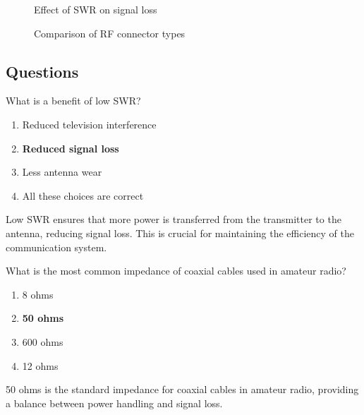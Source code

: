 \begin{figure}[h]
    \centering
    \caption{Effect of SWR on signal loss}
    \label{fig:swr_loss}
\end{figure}

\begin{figure}[h]
    \centering
    \caption{Comparison of RF connector types}
    \label{fig:rf_connectors}
\end{figure}

\subsection*{Questions}
\begin{tcolorbox}[colback=gray!10!white,colframe=black!75!black,title={T9B01}]
    What is a benefit of low SWR?
    \begin{enumerate}[label=\Alph*,noitemsep]
        \item Reduced television interference
        \item \textbf{Reduced signal loss}
        \item Less antenna wear
        \item All these choices are correct
    \end{enumerate}
\end{tcolorbox}
Low SWR ensures that more power is transferred from the transmitter to the antenna, reducing signal loss. This is crucial for maintaining the efficiency of the communication system.


\begin{tcolorbox}[colback=gray!10!white,colframe=black!75!black,title={T9B02}]
    What is the most common impedance of coaxial cables used in amateur radio?
    \begin{enumerate}[label=\Alph*,noitemsep]
        \item 8 ohms
        \item \textbf{50 ohms}
        \item 600 ohms
        \item 12 ohms
    \end{enumerate}
\end{tcolorbox}
50 ohms is the standard impedance for coaxial cables in amateur radio, providing a balance between power handling and signal loss.

